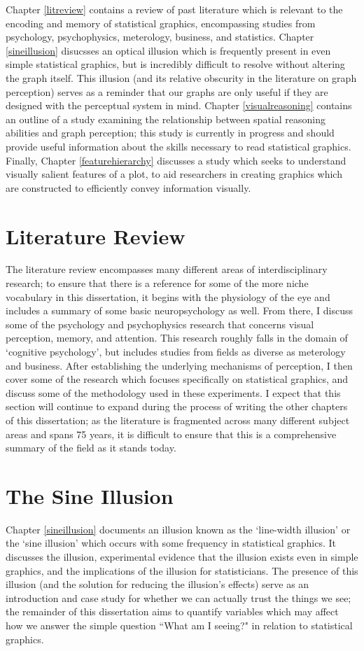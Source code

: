 \documentclass[11pt]{isuthesis}\usepackage[]{graphicx}\usepackage[]{color}
\begin{document}
Chapter \ref{litreview} contains a review of past literature which is relevant to the encoding and memory of statistical graphics, encompassing studies from psychology, psychophysics, meterology, business, and statistics. Chapter \ref{sineillusion} disucsses an optical illusion which is frequently present in even simple statistical graphics, but is incredibly difficult to resolve without altering the graph itself. This illusion (and its relative obscurity in the literature on graph perception) serves as a reminder that our graphs are only useful if they are designed with the perceptual system in mind. Chapter \ref{visualreasoning} contains an outline of a study examining the relationship between spatial reasoning abilities and graph perception; this study is currently in progress and should provide useful information about the skills necessary to read statistical graphics. Finally, Chapter \ref{featurehierarchy} discusses a study which seeks to understand visually salient features of a plot, to aid researchers in creating graphics which are constructed to efficiently convey information visually. 

\section{Literature Review}
The literature review encompasses many different areas of interdisciplinary research; to ensure that there is a reference for some of the more niche vocabulary in this dissertation, it begins with the physiology of the eye and includes a summary of some basic neuropsychology as well. From there, I discuss some of the psychology and psychophysics research that concerns visual perception, memory, and attention. This research roughly falls in the domain of `cognitive psychology', but includes studies from fields as diverse as meterology and business. After establishing the underlying mechanisms of perception, I then cover some of the research which focuses specifically on statistical graphics, and discuss some of the methodology used in these experiments. I expect that this section will continue to expand during the process of writing the other chapters of this dissertation; as the literature is fragmented across many different subject areas and spans 75 years, it is difficult to ensure that this is a comprehensive summary of the field as it stands today. 

\section{The Sine Illusion}
Chapter \ref{sineillusion} documents an illusion known as the `line-width illusion' or the `sine illusion' which occurs with some frequency in statistical graphics. It discusses the illusion, experimental evidence that the illusion exists even in simple graphics, and the implications of the illusion for statisticians. The presence of this illusion (and the solution for reducing the illusion's effects) serve as an introduction and case study for whether we can actually trust the things we see; the remainder of this dissertation aims to quantify variables which may affect how we answer the simple question ``What am I seeing?" in relation to statistical graphics. 
\end{document}
